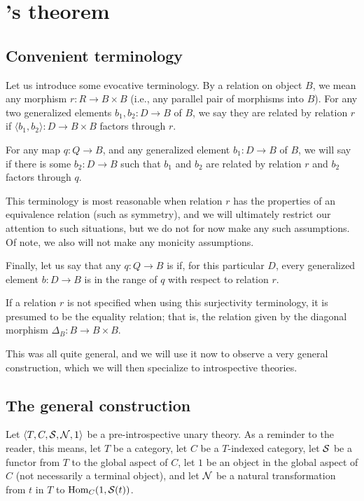 \section{\Loeb's theorem}

\subsection{Convenient terminology}
Let us introduce some evocative terminology. By a relation on object $B$, we mean any morphism $r : R \to B \times B$ (i.e., any parallel pair of morphisms into $B$). For any two generalized elements $b_1, b_2 : D \to B$ of $B$, we say they are related by relation $r$ if $\langle b_1, b_2 \rangle : D \to B \times B$ factors through $r$.

For any map $q: Q \to B$, and any generalized element $b_1 : D \to B$ of $B$, we will say  if there is some $b_2 : D \to B$ such that $b_1$ and $b_2$ are related by relation $r$ and $b_2$ factors through $q$.

This terminology is most reasonable when relation $r$ has the properties of an equivalence relation (such as symmetry), and we will ultimately restrict our attention to such situations, but we do not for now make any such assumptions. Of note, we also will not make any monicity assumptions.

Finally, let us say that any $q : Q \to B$ is  if, for this particular $D$, every generalized element $b : D \to B$ is in the range of $q$ with respect to relation $r$.

If a relation $r$ is not specified when using this surjectivity terminology, it is presumed to be the equality relation; that is, the relation given by the diagonal morphism $\Delta_B : B \to B \times B$.

This was all quite general, and we will use it now to observe a very general construction, which we will then specialize to introspective theories.

\subsection{The general construction}
\label{GeneralDiag}
Let $\langle T, C, \mathcal{S}, \mathcal{N}, 1 \rangle$ be a pre-introspective unary theory. As a reminder to the reader, this means, let $T$ be a category, let $C$ be a $T$-indexed category, let $\mathcal{S}$ be a functor from $T$ to the global aspect of $C$, let $1$ be an object in the global aspect of $C$ (not necessarily a terminal object), and let $\mathcal{N}$ be a natural transformation from $t$ in $T$ to $\operatorname{Hom}_C(1, \mathcal{S}(t))$.

